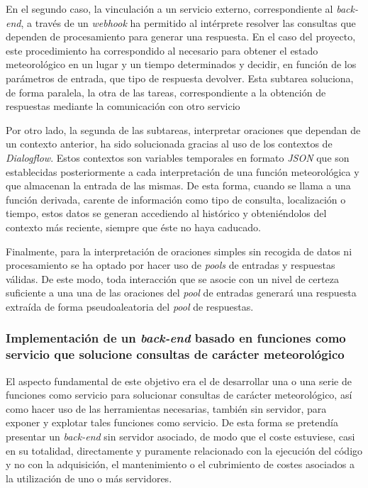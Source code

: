 \documentclass[11pt,spanish,listoffigures]{tfgetsinf}
\begin{document}
En el segundo caso, la vinculación a un servicio externo, correspondiente al \textit{back-end}, a través de un \textit{webhook} ha permitido al intérprete resolver las consultas que dependen de procesamiento para generar una respuesta. En el caso del proyecto, este procedimiento ha correspondido al necesario para obtener el estado meteorológico en un lugar y un tiempo determinados y decidir, en función de los parámetros de entrada, que tipo de respuesta devolver. Esta subtarea soluciona, de forma paralela, la otra de las tareas, correspondiente a la obtención de respuestas mediante la comunicación con otro servicio

Por otro lado, la segunda de las subtareas, interpretar oraciones que dependan de un contexto anterior, ha sido solucionada gracias al uso de los contextos de \textit{Dialogflow}. Estos contextos son variables temporales en formato \textit{JSON} que son establecidas posteriormente a cada interpretación de una función meteorológica y que almacenan la entrada de las mismas. De esta forma, cuando se llama a una función derivada, carente de información como tipo de consulta, localización o tiempo, estos datos se generan accediendo al histórico y obteniéndolos del contexto más reciente, siempre que éste no haya caducado.

Finalmente, para la interpretación de oraciones simples sin recogida de datos ni procesamiento se ha optado por hacer uso de \textit{pools} de entradas y respuestas válidas. De este modo, toda interacción que se asocie con un nivel de certeza suficiente a una una de las oraciones del \textit{pool} de entradas generará una respuesta extraída de forma pseudoaleatoria del \textit{pool} de respuestas.

\subsubsection{Implementación de un \textit{back-end} basado en funciones como servicio que solucione consultas de carácter meteorológico}
\label{subsubsec:conclusiones3}

El aspecto fundamental de este objetivo era el de desarrollar una o una serie de funciones como servicio para solucionar consultas de carácter meteorológico, así como hacer uso de las herramientas necesarias, también sin servidor, para exponer y explotar tales funciones como servicio. De esta forma se pretendía presentar un \textit{back-end} sin servidor asociado, de modo que el coste estuviese, casi en su totalidad, directamente y puramente relacionado con la ejecución del código y no con la adquisición, el mantenimiento o el cubrimiento de costes asociados a la utilización de uno o más servidores.
\end{document}
